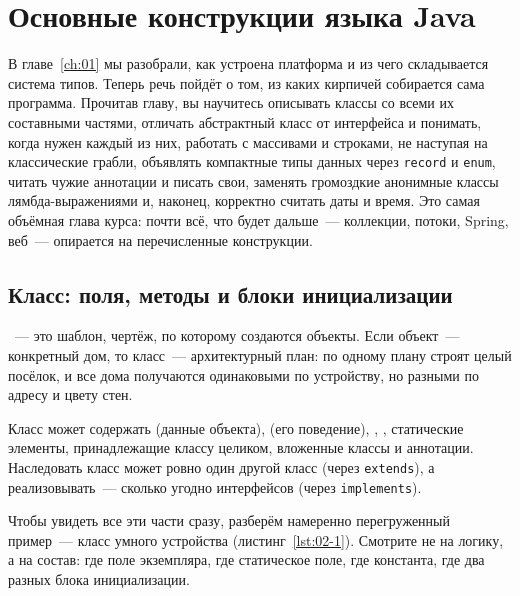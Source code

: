 \chapter{Основные конструкции языка Java}
\label{ch:02}

В главе~\ref{ch:01} мы разобрали, как устроена платформа и из чего складывается
система типов. Теперь речь пойдёт о том, из каких кирпичей собирается сама
программа. Прочитав главу, вы научитесь описывать классы со всеми их
составными частями, отличать абстрактный класс от интерфейса и понимать, когда
нужен каждый из них, работать с массивами и строками, не наступая на классические
грабли, объявлять компактные типы данных через \texttt{record} и \texttt{enum},
читать чужие аннотации и писать свои, заменять громоздкие анонимные классы
лямбда-выражениями и, наконец, корректно считать даты и время. Это самая
объёмная глава курса: почти всё, что будет дальше~--- коллекции, потоки, Spring,
веб~--- опирается на перечисленные конструкции.

\section{Класс: поля, методы и блоки инициализации}

~--- это шаблон, чертёж, по которому создаются объекты. Если
объект~--- конкретный дом, то класс~--- архитектурный план: по одному плану
строят целый посёлок, и все дома получаются одинаковыми по устройству, но
разными по адресу и цвету стен.

Класс может содержать  (данные объекта),  (его
поведение), , , статические
элементы, принадлежащие классу целиком, вложенные классы и аннотации.
Наследовать класс может ровно один другой класс (через \texttt{extends}), а
реализовывать~--- сколько угодно интерфейсов (через \texttt{implements}).

Чтобы увидеть все эти части сразу, разберём намеренно перегруженный пример~---
класс умного устройства (листинг~\ref{lst:02-1}). Смотрите не на логику, а на
состав: где поле экземпляра, где статическое поле, где константа, где два
разных блока инициализации.

